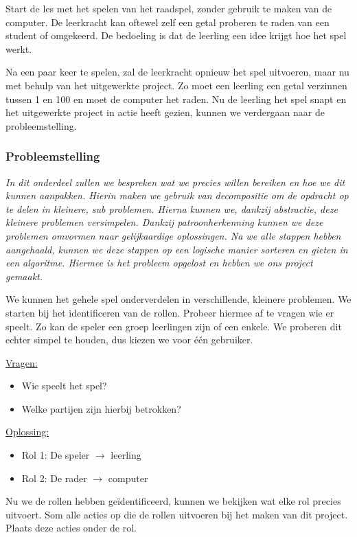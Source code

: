 Start de les met het spelen van het raadspel, zonder gebruik te maken van de computer. De leerkracht kan oftewel zelf een getal proberen te raden van een student of omgekeerd. De bedoeling is dat de leerling een idee krijgt hoe het spel werkt. 

Na een paar keer te spelen, zal de leerkracht opnieuw het spel uitvoeren, maar nu met behulp van het uitgewerkte project. Zo moet een leerling een getal verzinnen tussen 1 en 100 en moet de computer het raden. Nu de leerling het spel snapt en het uitgewerkte project in actie heeft gezien, kunnen we verdergaan naar de probleemstelling.

\subsubsection{Probleemstelling}
\emph{In dit onderdeel zullen we bespreken wat we precies willen bereiken en hoe we dit kunnen aanpakken. Hierin maken we gebruik van decompositie om de opdracht op te delen in kleinere, sub problemen. Hierna kunnen we, dankzij abstractie, deze kleinere problemen versimpelen. Dankzij patroonherkenning kunnen we deze problemen omvormen naar gelijkaardige oplossingen. Na we alle stappen hebben aangehaald, kunnen we deze stappen op een logische manier sorteren en gieten in een algoritme. Hiermee is het probleem opgelost en hebben we ons project gemaakt.}

We kunnen het gehele spel onderverdelen in verschillende, kleinere problemen. We starten bij het identificeren van de rollen. Probeer hiermee af te vragen wie er speelt. Zo kan de speler een groep leerlingen zijn of een enkele. We proberen dit echter simpel te houden, dus kiezen we voor één gebruiker.

\underline{Vragen:}
\begin{itemize}
    \item Wie speelt het spel?
    \item Welke partijen zijn hierbij betrokken?
\end{itemize}
\underline{Oplossing:}
\begin{itemize}
    \item Rol 1: De speler $\rightarrow$ leerling
    \item Rol 2: De rader $\rightarrow$ computer
\end{itemize}

Nu we de rollen hebben geïdentificeerd, kunnen we bekijken wat elke rol precies uitvoert. Som alle acties op die de rollen uitvoeren bij het maken van dit project. Plaats deze acties onder de rol.

